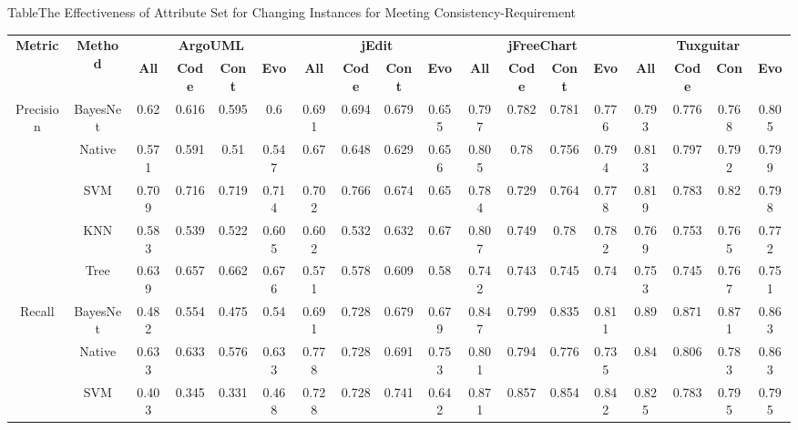 {{\begin{table*}[htbp]
\scriptsize
{Table$\!$}{The Effectiveness of Attribute Set for Changing Instances for Meeting Consistency-Requirement}
\vspace{0.5em}
\centering
\begin{tabular}{cccccccccccccccccc}
\toprule[1.5pt]
\multirow{2}{*}{\textbf{Metric}}&\multirow{2}{*}{\textbf{Method}}&\multicolumn{4}{c}{\textbf{ArgoUML}}&\multicolumn{4}{c}{\textbf{jEdit}}&\multicolumn{4}{c}{\textbf{jFreeChart}}&\multicolumn{4}{c}{\textbf{Tuxguitar}}\\
\cline{3-18}
&&\textbf{All}&\textbf{Code}&\textbf{Cont}&\textbf{Evo}&\textbf{All}&\textbf{Code}&\textbf{Cont}&\textbf{Evo}&\textbf{All}&\textbf{Code}&\textbf{Cont}&\textbf{Evo}&\textbf{All}&\textbf{Code}&\textbf{Con}&\textbf{Evo}~\\
\midrule[1pt]
\multirow{5}{*}{Precision}
&BayesNet&0.62	&0.616&	0.595&	0.6&		0.691&	0.694	&0.679	&0.655	&	0.797	&0.782	&0.781	&0.776		&0.793	&0.776	&0.768&	0.805\\
&Native&0.571	&0.591&	0.51&	0.547	&	0.67&	0.648	&0.629	&0.656	&	0.805	&0.78	&0.756	&0.794	&	0.813	&0.797	&0.792&	0.799\\
&SVM&	0.709	&0.716	&0.719	&0.714		&0.702	&0.766	&0.674	&0.65		&0.784	&0.729	&0.764	&0.778	&	0.819	&0.783	&0.82&	0.798\\
&KNN&	0.583	&0.539	&0.522	&0.605		&0.602	&0.532	&0.632	&0.67		&0.807	&0.749	&0.78	&0.782		&0.769	&0.753	&0.765	&0.772\\
&Tree&	0.639	&0.657	&0.662	&0.676		&0.571	&0.578	&0.609	&0.58		&0.742	&0.743	&0.745&	0.74		&0.753	&0.745	&0.767	&0.751\\
\hline
\multirow{5}{*}{Recall}
&BayesNet&0.482	&0.554	&0.475	&0.54		&0.691	&0.728	&0.679	&0.679		&0.847	&0.799	&0.835	&0.811		&0.89	&0.871	&0.871	&0.863\\
&Native&0.633	&0.633	&0.576	&0.633		&0.778	&0.728	&0.691	&0.753		&0.801	&0.794	&0.776	&0.735		&0.84	&0.806	&0.783	&0.863\\
&SVM&	0.403	&0.345	&0.331	&0.468		&0.728	&0.728	&0.741	&0.642		&0.871	&0.857	&0.854	&0.842		&0.825	&0.783	&0.795	&0.795\\

\end{tabular}
\end{table*}}}
